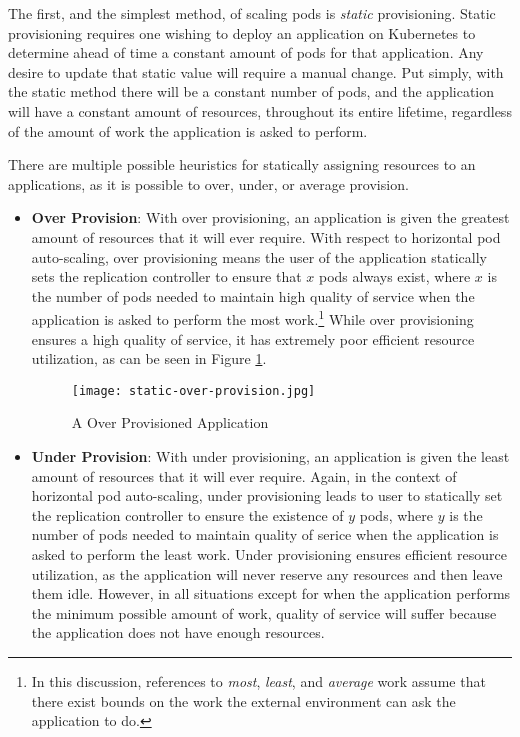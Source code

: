 The first, and the simplest method, of scaling pods is \textit{static}
provisioning. Static provisioning requires one wishing to deploy an application on
Kubernetes to determine ahead of time a constant amount of pods for that
application. Any desire to update that static value will require a manual
change. Put simply, with the static method there will be a constant number of
pods, and the application will have a constant amount of resources, throughout
its entire lifetime, regardless of the amount of work the application is asked
to perform.

There are multiple possible heuristics for statically assigning resources to an
applications, as it is possible to over, under, or average provision.

\begin{itemize}
  \item \textbf{Over Provision}: With over provisioning, an application is given
    the greatest amount of resources that it will ever require. With respect to
    horizontal pod auto-scaling, over provisioning means the user of the
    application statically sets the replication controller to ensure that $x$ pods
    always exist, where $x$ is the number of pods needed to
    maintain high quality of service when the application is
    asked to perform the most work.\footnote{In this discussion, references to
      \textit{most}, \textit{least}, and \textit{average} work assume that there
      exist bounds on the work the external environment can ask the application to
      do.} While over provisioning ensures a high quality of service, it has extremely
      poor efficient resource utilization, as can be seen in Figure
      \ref{fig:static-over-provision}.

    \begin{figure}[!h]
      \centerline{\texttt{[image: static-over-provision.jpg]}}
      \caption{A Over Provisioned Application}
      \label{fig:static-over-provision}
    \end{figure}

  \item \textbf{Under Provision}: With under provisioning, an application is
    given the least amount of resources that it will ever require. Again, in the
    context of horizontal pod auto-scaling, under provisioning leads to user to
    statically set the replication controller to ensure the existence of
    $y$ pods, where $y$ is the number of pods needed to maintain quality of
    serice when the application is asked to perform the least work. Under
    provisioning ensures efficient resource utilization, as the application will
    never reserve any resources and then leave them idle. However, in all
    situations except for when the application performs the minimum possible
    amount of work, quality of service will suffer because the application does
    not have enough resources.


\end{itemize}
